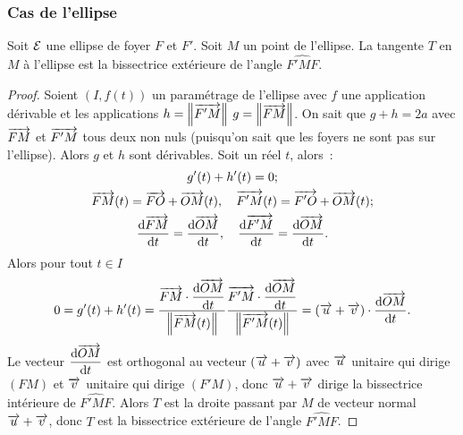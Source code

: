\subsubsection{Cas de l'ellipse}
\begin{prop}
  Soit $\mathcal{E}$ une ellipse de foyer $F$ et $F'$. Soit $M$ un point de l'ellipse. La tangente $T$ en $M$ à l'ellipse est la bissectrice extérieure de l'angle $\widehat{F'MF}$.
\end{prop}
\begin{proof}
  Soient $(I,f(t))$ un paramétrage de l'ellipse avec $f$ une application dérivable et les applications $h=\left\lVert\overrightarrow{F'M}\right\rVert$ $g=\left\lVert\overrightarrow{FM}\right\rVert$. On sait que $g+h=2a$ avec $\overrightarrow{FM}$ et $\overrightarrow{F'M}$ tous deux non nuls (puisqu'on sait que les foyers ne sont pas sur l'ellipse). Alors $g$ et $h$ sont dérivables. Soit un réel $t$, alors~:
\begin{gather}
  g'(t)+h'(t)=0; \\
  \overrightarrow{FM}(t)=\overrightarrow{FO}+\overrightarrow{OM}(t), \quad \overrightarrow{F'M}(t)=\overrightarrow{F'O}+\overrightarrow{OM}(t);\\
  \dfrac{\mathrm{d} \overrightarrow{FM}}{\mathrm{d} t}=\dfrac{\mathrm{d} \overrightarrow{OM}}{\mathrm{d} t}, \quad \dfrac{\mathrm{d} \overrightarrow{F'M}}{\mathrm{d} t}=\dfrac{\mathrm{d} \overrightarrow{OM}}{\mathrm{d} t}.
\end{gather}
  Alors pour tout $t \in I$
  \begin{equation}
    0=g'(t)+h'(t)=\frac{\overrightarrow{FM}\cdot\dfrac{\mathrm{d} \overrightarrow{OM}}{\mathrm{d} t}}{\left\lVert\overrightarrow{FM}(t)\right\rVert}\frac{\overrightarrow{F'M}\cdot\dfrac{\mathrm{d} \overrightarrow{OM}}{\mathrm{d} t}}{\left\lVert\overrightarrow{F'M}(t)\right\rVert}=(\overrightarrow{u}+\overrightarrow{v})\cdot \dfrac{\mathrm{d} \overrightarrow{OM}}{\mathrm{d} t}.
  \end{equation}
Le vecteur $\dfrac{\mathrm{d} \overrightarrow{OM}}{\mathrm{d} t}$ est orthogonal au vecteur $(\overrightarrow{u}+\overrightarrow{v})$ avec $\overrightarrow{u}$ unitaire qui dirige $(FM)$ et $\overrightarrow{v}$ unitaire qui dirige $(F'M)$, donc $\overrightarrow{u}+\overrightarrow{v}$ dirige la bissectrice intérieure de $\widehat{F'MF}$. Alors $T$ est la droite passant par $M$ de vecteur normal $\overrightarrow{u}+\overrightarrow{v}$, donc $T$ est la bissectrice extérieure de l'angle $\widehat{F'MF}$.
\end{proof}

